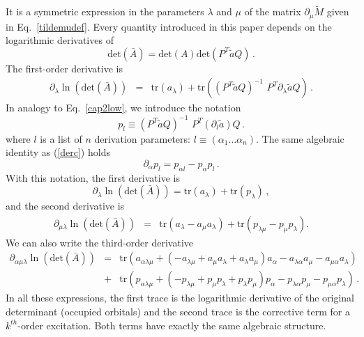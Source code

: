 \documentclass[aip,jcp,reprint,floatfix,onecolumn]{revtex4-1}
\def\det{\text{det}}
\def\tr{\text{tr}}
\def\l{\alpha_1  \dots \alpha_n}
\begin{document}
It is a symmetric expression in the parameters $\lambda$ and $\mu$ of the matrix $\partial_\mu \tilde{M}$ given in Eq.~\ref{tildemudef}.
Every quantity introduced in this paper depends on the logarithmic derivatives of
\begin{equation}
\det (\bar{A}) = \det (A) \det (P^T \tilde{a}Q)\,.
\end{equation}
The first-order derivative is
\begin{eqnarray}
\partial_\lambda \ln (\det (\bar{A})) %
 &= &   \tr(a_\lambda) +\tr ((P^T \tilde{a}Q)^{-1} \, \, P^T \partial_\lambda \tilde{a} Q )\,.
\end{eqnarray}
In analogy to Eq.~\ref{cap2low}, we introduce the notation
\begin{equation}
p_{l} \equiv ( P^T \tilde{a} Q)^{-1} \, \,  P^T(\partial_{l} \tilde{a}) Q\,.
\label{defp}
\end{equation}
where $l$ is a list of $n$ derivation parameters: $l\equiv (\l)$.
The same algebraic identity as (\ref{derc}) holds
\begin{equation}
\partial_{\alpha} p_{l}  =     p_{\alpha l} -p_\alpha {p_l}\,.
\end{equation}
With this  notation, the first derivative is
\begin{equation}
\partial_\lambda \ln (\det (\bar{A}))  =  \tr(a_\lambda) +\tr (p_\lambda)\,,
\end{equation}
and the second derivative is
\begin{eqnarray}
\partial_{\mu \lambda} \ln (\det (\bar{A})) & =&  \tr(a_\lambda-a_\mu a_\lambda )+\tr \left(p_{\lambda \mu} -p_\mu p_\lambda \right) .
\end{eqnarray}
We can also write the third-order derivative
\begin{eqnarray}
\partial_{\alpha \mu \lambda} \ln (\det (\bar{A})) & = &\tr \left(a_{\alpha \lambda \mu}     + (- a_{\lambda \mu} + a_{\mu} a_\lambda +a_\lambda a_\mu)a_\alpha   - a_{\lambda \alpha}a_{\mu  } -a_{\mu \alpha } a_\lambda \right) \nonumber \\
& + &\tr \left(p_{\alpha \lambda \mu}     + (- p_{\lambda \mu} + p_{\mu} p_\lambda +p_\lambda p_\mu)p_\alpha   - p_{\lambda \alpha}p_{\mu  } -p_{\mu \alpha } p_\lambda
 \right)\,.
\end{eqnarray}
In all these expressions,  the first trace is the logarithmic derivative of the original determinant (occupied orbitals) and the second trace
is the  corrective term for a $k^{th}$-order excitation. Both terms  have exactly the same algebraic structure.
\end{document}
